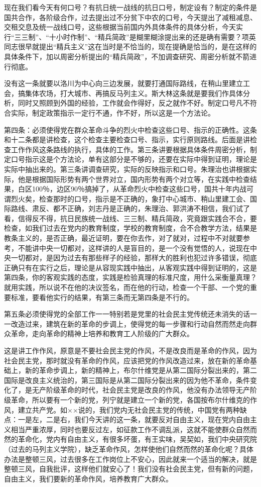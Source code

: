 现在我们看今天有何口号？有抗日统一战线的抗日口号，制定设有？制定的条件是国共合作，各阶级合作，过去提出过不分贫下中农的口号，今天提出了减租减息、交租交息及统一战线口号，这些根据当前国内外具体条件的具体分析，今天实行“三三制”、“十小时作制”、“精兵简政”是糊里糊涂提出来的还是确有需要？项英同志很早就提出“精兵主义”这在当时是不恰当的，现在提确是恰当的，是在这样的具体条件下，加以周密分析提出的“精兵简政”，不加调查研究、周密分析就不箭进行彻底。

没有这一条就要以洛川为中心向三边发展，就要打通国际路线，在稍山里建立工会，搞集体农场，打大城市、再搞反马列主义。斯大林这条就是要我们作具体分析，同时又照顾到外国的经验，工作就会作得好，反之就作不好。制定口号凡不符合实际，制定政策指示一定行不通，作不好，所以这是一个方法论。

第四条：必须使得党在群众革命斗争的烈火中检查这些口号、指示的正确性。这条和十二条都是讲检查，这个检查主要检查口号、指示，实行原则路线。后面是讲检查工作作风这条路线的执行，具体的工作。第三条讲要根据具体条件周密分析，制定口号指示这是个方法论，单有这部分是不够的，还要在实际中得到证明，理论是实际中抽出来的。第三条讲调查研究，实际的反映指示和口号。朱理治也讲根据实际，他是根据国际形势有两个世界对立，国内形势有两个对立等，在实践中检查结果，白区100％，边区90％搞掉了，从革命烈火中检查这些口号，国共十年内战可谓烈火矣，检查那时的口号，指示是不正确的，象打中心城市、稍山里建工会、国际路线、肃反、都不正确，刘志丹是正确的，朱理治、郭洪涛不相信，我们试了看，信得反不得，抗日民族统一战线、三三制、精兵简政，究竟跟实践合不合，要检查，如我们过去在党内的教育制度，学校的教育制度，合不合教学方法，结果是教条主义的，是否正确，最近证明，要在你去作，对了就对，过程中不对就要参考，不能讲中央一切都对，这样讲的人是盲目的，是一个没有觉悟的人，说现在中央一切都对，是因为过去有那些样子的经验，那样大的胜利也犯过许多错误，彻底正确只有在实行之后，理论是从容现实践中抽出，从客观实践中得到证明的，这是第四条，你的客观实践的态度，实践是检验真理的标准尺度，用什么采衡量真理？就用实践，所以说不在他的决议签名，而在他的行动，检查一个干部、一个党的重要标准，要看他实行的结果，有第三条而无第四条是不行的。

第五条必须使得党的全部工作一一特别若是党里的社会民主党传统还未消失的话一一改造过来，建筑在新的革命的步调上，使得党的每一步骤和行动自然而然走向群众革命，走向革命的精神上培养和教育工人阶级的广大群众。

这是讲工作作风，原意是不要社会民主党的作风，不是改良而是革命的作风，因为社会民主党，那时就没有革命的作风，应该把党的作风改造过来，放在新的革命基础上，新的革命步调上，新的精神上，布尔什维党是从第二国际分裂出来的，第二国际是改良主义统治的，第三国际是从第二国际分裂出来的因为他不革命，条件变化了，是无产阶级革命的时代，社会民主党是改良的作风，他没有办法领导无产阶级革命，所以要有一个新的党，列宁就是建立一个新的党，各国按布尔什维克的作风，建立共产党。如××说的，我们党内无社会民主党的传统，中国党有两种缺点：一是左，二是右，我们今天讲的这一条，就要反对自由主义，现在党内自由主义相当严重浓厚，同时也要反过左，如征款工作不调乱派，这就不能使群众自然而然的革命化，党内有自由主义，有很多坏蛋，有王实味，吴契如，我们中央研究院（过去的马列主义学院），缺乏革命作风，怎样使他们自然而然的革命化呢？具体办法是整顿三风，过去很多在工作岗位上不安心，因此就来一个适当的解决，就是整顿三风，自我批评，这样他们就安心了！我们没有社会民主党，但有新的问题，自由主义，我们要新的革命作风，培养教育广大群众。

